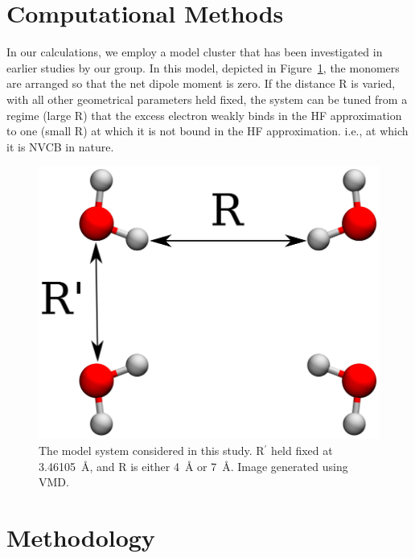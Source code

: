 \section{Computational Methods}
In our calculations, we employ a model  cluster that has been investigated in earlier studies by our group.\cite{Arai_H2O4_1,Arai_H2O4_2}
In this model, depicted in Figure~\ref{fig:water4cluster}, the monomers are arranged so that the net dipole moment is zero.
If the distance R is varied, with all other geometrical parameters held fixed, the system can be tuned from a regime (large R) that the excess electron weakly binds in the HF approximation to one (small R) at which it is not bound in the HF approximation. i.e., at which it is NVCB in nature.

\begin{figure}
    \includegraphics[width=\columnwidth,keepaspectratio]{Images/chapter3/h2o4_labeled.eps}
    \caption{\label{fig:water4cluster} The  model  system considered in this study. R$^{'}$ held fixed at \SI{3.46105}{\angstrom}, and R is either \SI{4}{\angstrom} or \SI{7}{\angstrom}. Image generated using VMD.\cite{VMD}}
\end{figure}

\section{Methodology}
